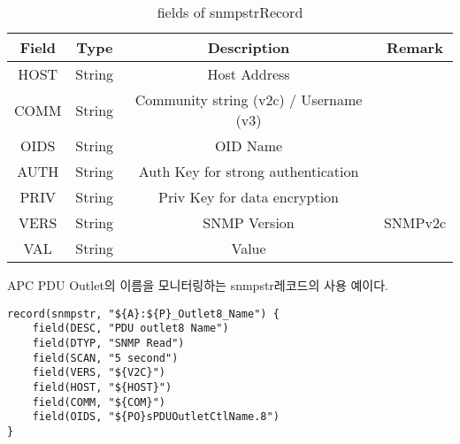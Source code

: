 \documentclass[11pt
  , a4paper
  , article
  , oneside
]{memoir}
\begin{document}
\begin{table}[!h]
\begin{center}
\begin{tabular}{cccc}\hline
Field & Type & Description & Remark\\ \hline
HOST & String & Host Address \\ \hline
COMM & String & Community string (v2c) / Username (v3) \\ \hline
OIDS & String & OID Name \\ \hline
AUTH & String & Auth Key for strong authentication \\ \hline
PRIV & String & Priv Key for data encryption\\ \hline
VERS & String & SNMP Version & SNMPv2c	 \\ \hline
VAL & String & Value \\ \hline
\end{tabular}
\caption{fields of snmpstrRecord}
\label{table:snmpstrrecord} 
\end{center}
\end{table} 

APC PDU Outlet의 이름을 모니터링하는 snmpstr레코드의 사용 예이다. 

{\scriptsize
\begin{verbatim}
record(snmpstr, "${A}:${P}_Outlet8_Name") {
    field(DESC, "PDU outlet8 Name")
    field(DTYP, "SNMP Read")
    field(SCAN, "5 second")
    field(VERS, "${V2C}")
    field(HOST, "${HOST}")
    field(COMM, "${COM}")
    field(OIDS, "${PO}sPDUOutletCtlName.8")
}
\end{verbatim}
}
\end{document}
